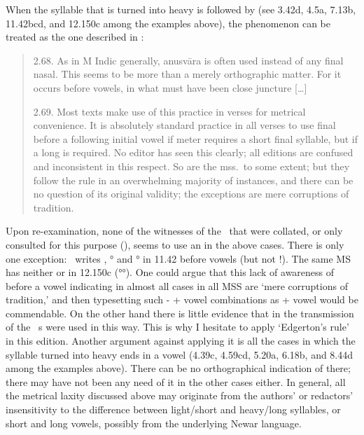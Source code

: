\noindent
When the syllable that is turned into heavy is followed by 
(see 3.42d, 4.5a, 7.13b, 11.42bcd, and 12.150c among the examples above), 
the phenomenon can be treated as the one described in 
:

\begin{quote}
2.68. As in M Indic generally, anusvāra is often used
instead of any final nasal. This seems to be more than a
merely orthographic matter. For it occurs before vowels,
in what must have been close juncture [\dots] 

2.69. Most texts make use of this practice in verses
for metrical convenience. It is absolutely standard practice
in all verses to use final  before a following initial vowel
if meter requires a short final syllable, but  if a long is
required. No editor has seen this clearly; all editions are
confused and inconsistent in this respect. So are the mss.\ to 
some extent; but they follow the rule in an overwhelming
majority of instances, and there can be no question of its
original validity; the exceptions are mere corruptions of
tradition.
\end{quote}
  
\noindent
Upon re-examination, none of the witnesses of the \VSS\ that were collated, 
or only consulted for this purpose (\msCa\msCb\msCc\allowbreak\msNa\msNb\msNc\msM\msParis\msKoa\msKob),
seems to use an  in the above cases. There is only one exception:
\msM\ writes , ° 
and ° in 11.42 before vowels (but not
!). The same MS has neither 
 or  in 12.150c (°°).
One could argue that this lack of awareness of  before
a vowel indicating  in almost all cases in all MSS
are `mere corruptions of tradition,' and then typesetting
such - + vowel combinations as  + vowel 
would be commendable.
On the other hand there is little evidence that in the transmission
of the \VSS\ s were used in this way. This is why
I hesitate to apply `Edgerton's rule' in this edition. Another argument
against applying it is all the cases in which the syllable turned into heavy
ends in a vowel (4.39c, 4.59cd, 5.20a, 6.18b, and 8.44d among the
examples above). There can be no orthographical indication of  there;
there may have not been any need of it in the other cases either.
In general, all the metrical laxity discussed above may originate from
the authors' or redactors' insensitivity to the difference between light/short and heavy/long
syllables, or short and long vowels, possibly from the underlying Newar language. 


